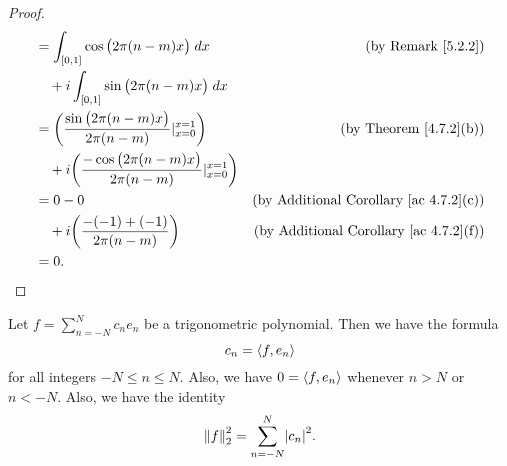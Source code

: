 \begin{proof}
\begin{align*}
         & = \int_{[0, 1]} \cos\big(2 \pi (n - m) x\big) \; dx                                         & \text{(by Remark \ref{5.2.2})}                     \\
         & \quad + i \int_{[0, 1]} \sin\big(2 \pi (n - m) x\big) \; dx                                                                                      \\
         & = \bigg(\frac{\sin\big(2 \pi (n - m) x\big)}{2 \pi (n - m)}|_{x = 0}^{x = 1}\bigg)          & \text{(by Theorem \ref{4.7.2}(b))}                 \\
         & \quad + i \bigg(\frac{-\cos\big(2 \pi (n - m) x\big)}{2 \pi (n - m)}|_{x = 0}^{x = 1}\bigg)                                                      \\
         & = 0 - 0                                                                                     & \text{(by Additional Corollary \ref{ac 4.7.2}(c))} \\
         & \quad + i \bigg(\frac{- (-1) + (-1)}{2 \pi (n - m)}\bigg)                                   & \text{(by Additional Corollary \ref{ac 4.7.2}(f))} \\
         & = 0.
    \end{align*}
\end{proof}

\begin{corollary}\label{5.3.6}
    Let \(f = \sum_{n = -N}^N c_n e_n\) be a trigonometric polynomial.
    Then we have the formula
    \[
        c_n = \inner*{f, e_n}
    \]
    for all integers \(-N \leq n \leq N\).
    Also, we have \(0 = \inner*{f, e_n}\) whenever \(n > N\) or \(n < -N\).
    Also, we have the identity
    \[
        \norm*{f}_2^2 = \sum_{n = -N}^N \abs*{c_n}^2.
    \]
\end{corollary}

